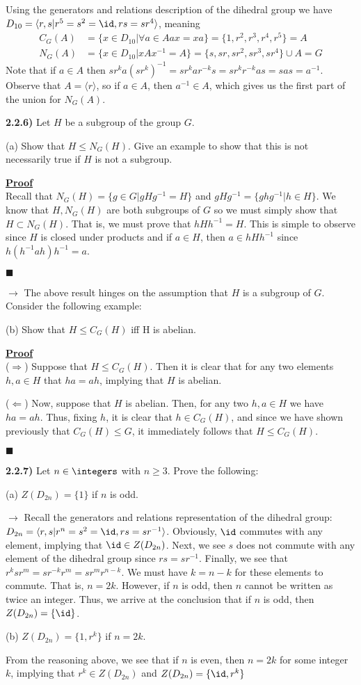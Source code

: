 \documentclass[12pt,a4paper]{article}
\newcommand{\prob}[2]{\textbf{#1)} #2}
\newenvironment{proof}
{
\textbf{\underline{Proof}} \\
}
{
\begin{flushright}
$\blacksquare$
\end{flushright}}
\begin{document}
Using the generators and relations description of the dihedral group we have $D_{10} = \langle r,s | r^5 = s^2 = \id, rs = sr^{4} \rangle$, meaning
\begin{align*}
C_G(A) &= \{x \in D_{10} | \forall a \in A ax = xa \} = \{1,r^2,r^3,r^4,r^5\} = A  \\
N_G(A) &= \{x \in D_{10} | xAx^{-1} = A \} = \{s,sr,sr^2,sr^3,sr^4\} \cup A = G
\end{align*}
Note that if $a \in A$ then $sr^{k}a(sr^{k})^{-1} = sr^{k}ar^{-k}s = sr^{k}r^{-k}as = sas = a^{-1}$. Observe that $A = \langle r \rangle$, so if $a \in A$, then $a^{-1} \in A$, which gives us the first part of the union for $N_G(A)$.

\prob{2.2.6}{Let $H$ be a subgroup of the group $G$.}

(a) Show that $H \leq N_G(H)$. Give an example to show that this is not necessarily true if $H$ is not a subgroup.

\begin{proof}
Recall that $N_{G}(H) = \{g \in G | gHg^{-1} = H\}$ and $gHg^{-1} = \{ghg^{-1} | h \in H\}$. We know that $H,N_G(H)$ are both subgroups of $G$ so we must simply show that $H \subset N_G(H)$. That is, we must prove that $hHh^{-1} = H$. This is simple to observe since $H$ is closed under products and if $a \in H$, then $a \in hHh^{-1}$ since $h(h^{-1}ah)h^{-1} = a$.
\end{proof}

$\rightarrow$ The above result hinges on the assumption that $H$ is a subgroup of $G$. Consider the following example: 

(b) Show that $H \leq C_G(H)$ iff H is abelian.

\begin{proof}
($\Rightarrow$) Suppose that $H \leq C_G(H)$. Then it is clear that for any two elements $h,a \in H$ that $ha = ah$, implying that $H$ is abelian. 

($\Leftarrow$) Now, suppose that $H$ is abelian. Then, for any two $h,a \in H$ we have $ha = ah$. Thus, fixing $h$, it is clear that $h \in C_G(H)$, and since we have shown previously that $C_G(H) \leq G$, it immediately follows that $H \leq C_G(H)$.
\end{proof}

\prob{2.2.7}{Let $n \in \integers$ with $n \geq 3$. Prove the following:}

(a) $Z(D_{2n}) = \{1\}$ if $n$ is odd.

$\rightarrow$ Recall the generators and relations representation of the dihedral group: $D_{2n} = \langle r,s | r^n = s^2 = \id, rs = sr^{-1} \rangle$. Obviously, $\id$ commutes with any element, implying that $\id \in Z(D_{2n})$. Next, we see $s$ does not commute with any element of the dihedral group since $rs = sr^{-1}$. Finally, we see that $r^{k}sr^{m} = sr^{-k}r^{m} = sr^{m}r^{n-k}$. We must have $k = n-k$ for these elements to commute. That is, $n = 2k$. However, if $n$ is odd, then $n$ cannot be written as twice an integer. Thus, we arrive at the conclusion that if $n$ is odd, then $Z(D_{2n}) = \{\id\}$.

(b) $Z(D_{2n}) = \{1,r^k\}$ if $n = 2k$.

From the reasoning above, we see that if $n$ is even, then $n = 2k$ for some integer $k$, implying that $r^k \in Z(D_{2n})$ and  $Z(D_{2n}) = \{\id,r^k\}$
\end{document}
